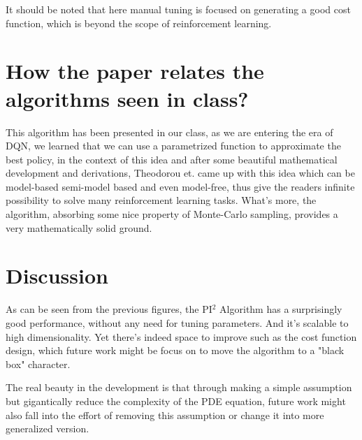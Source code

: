 \documentclass[journal]{IEEEtran}
\begin{document}
It should be noted that here manual tuning is focused on generating a good cost function, which is beyond the scope of reinforcement learning. 



\section{How the paper relates the algorithms seen in class?}

This algorithm has been presented in our class, as we are entering the era of DQN, we learned that we can use a parametrized function to
approximate the best policy, in the context of this idea and after some beautiful mathematical development and derivations, Theodorou et. came
up with this idea which can be model-based semi-model based and even model-free, thus give the readers infinite possibility to solve many 
reinforcement learning tasks. What's more, the algorithm, absorbing some nice property of Monte-Carlo sampling, provides a
 very mathematically solid ground.



\section{Discussion}

As can be seen from the previous figures, the PI$^2$ Algorithm has a surprisingly good performance, without any need for tuning parameters. And it's scalable to high dimensionality.
Yet there's indeed space to improve such as the cost function design, which future work might be focus on to move the algorithm to a "black box" character.

The real beauty in the development is that through making a simple assumption but gigantically reduce the complexity of the PDE equation, future work might also fall into the effort
of removing this assumption or change it into more generalized version.

%
\end{document}
